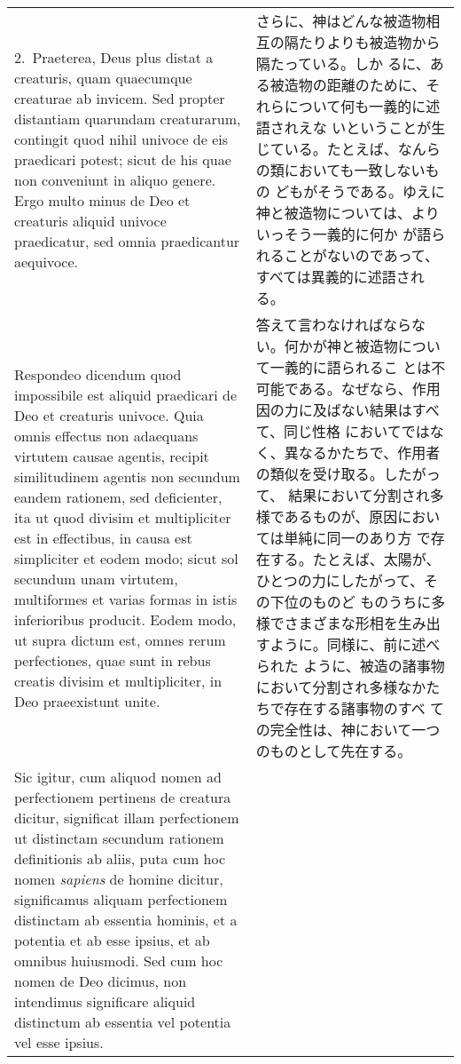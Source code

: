 \documentclass[10pt]{jsarticle}
\begin{document}
\begin{longtable}{p{21em}p{21em}}
\\

2.~{\sc Praeterea}, Deus plus distat a creaturis, quam quaecumque
creaturae ab invicem. Sed propter distantiam quarundam creaturarum,
contingit quod nihil univoce de eis praedicari potest; sicut de his
quae non conveniunt in aliquo genere. Ergo multo minus de Deo et
creaturis aliquid univoce praedicatur, sed omnia praedicantur
aequivoce.

&

さらに、神はどんな被造物相互の隔たりよりも被造物から隔たっている。しか
るに、ある被造物の距離のために、それらについて何も一義的に述語されえな
いということが生じている。たとえば、なんらの類においても一致しないもの
どもがそうである。ゆえに神と被造物については、よりいっそう一義的に何か
が語られることがないのであって、すべては異義的に述語される。

\\

{\sc Respondeo dicendum} quod impossibile est aliquid praedicari de
Deo et creaturis univoce. Quia omnis effectus non adaequans virtutem
causae agentis, recipit similitudinem agentis non secundum eandem
rationem, sed deficienter, ita ut quod divisim et multipliciter est in
effectibus, in causa est simpliciter et eodem modo; sicut sol secundum
unam virtutem, multiformes et varias formas in istis inferioribus
producit. Eodem modo, ut supra dictum est, omnes rerum perfectiones,
quae sunt in rebus creatis divisim et multipliciter, in Deo
praeexistunt unite.

&

答えて言わなければならない。何かが神と被造物について一義的に語られるこ
とは不可能である。なぜなら、作用因の力に及ばない結果はすべて、同じ性格
においてではなく、異なるかたちで、作用者の類似を受け取る。したがって、
結果において分割され多様であるものが、原因においては単純に同一のあり方
で存在する。たとえば、太陽が、ひとつの力にしたがって、その下位のものど
ものうちに多様でさまざまな形相を生み出すように。同様に、前に述べられた
ように、被造の諸事物において分割され多様なかたちで存在する諸事物のすべ
ての完全性は、神において一つのものとして先在する。

\\

Sic igitur, cum aliquod nomen ad perfectionem pertinens de creatura
dicitur, significat illam perfectionem ut distinctam secundum rationem
definitionis ab aliis, puta cum hoc nomen {\it sapiens} de homine
dicitur, significamus aliquam perfectionem distinctam ab essentia
hominis, et a potentia et ab esse ipsius, et ab omnibus huiusmodi. Sed
cum hoc nomen de Deo dicimus, non intendimus significare aliquid
distinctum ab essentia vel potentia vel esse ipsius.


\end{longtable}
\end{document}
